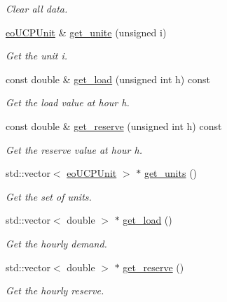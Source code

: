 \begin{DoxyCompactItemize}
\begin{DoxyCompactList}\small\item\em \-Clear all data. \end{DoxyCompactList}\item 
\hyperlink{classeo_u_c_p_unit}{eo\-U\-C\-P\-Unit} \& \hyperlink{classeo_u_c_p_data_a6c6ddc5aede011ca15b4e54e3de9f313}{get\-\_\-unite} (unsigned i)
\begin{DoxyCompactList}\small\item\em \-Get the unit i. \end{DoxyCompactList}\item 
const double \& \hyperlink{classeo_u_c_p_data_af82d1cb78718b45bf3e5cf0155b52047}{get\-\_\-load} (unsigned int h) const 
\begin{DoxyCompactList}\small\item\em \-Get the load value at hour h. \end{DoxyCompactList}\item 
const double \& \hyperlink{classeo_u_c_p_data_aa1487ad1b7221a6770a4f15f774e0702}{get\-\_\-reserve} (unsigned int h) const 
\begin{DoxyCompactList}\small\item\em \-Get the reserve value at hour h. \end{DoxyCompactList}\item 
std\-::vector$<$ \hyperlink{classeo_u_c_p_unit}{eo\-U\-C\-P\-Unit} $>$ $\ast$ \hyperlink{classeo_u_c_p_data_a0370b3d7bec1e0e0783a1716158d7ccf}{get\-\_\-units} ()
\begin{DoxyCompactList}\small\item\em \-Get the set of units. \end{DoxyCompactList}\item 
std\-::vector$<$ double $>$ $\ast$ \hyperlink{classeo_u_c_p_data_ade3f3b604c8d0f755e8d8097cedbe67b}{get\-\_\-load} ()
\begin{DoxyCompactList}\small\item\em \-Get the hourly demand. \end{DoxyCompactList}\item 
std\-::vector$<$ double $>$ $\ast$ \hyperlink{classeo_u_c_p_data_ad4daa240aa40ef2c6f96ba115cdf6cc4}{get\-\_\-reserve} ()
\begin{DoxyCompactList}\small\item\em \-Get the hourly reserve. \end{DoxyCompactList}\end{DoxyCompactItemize}


